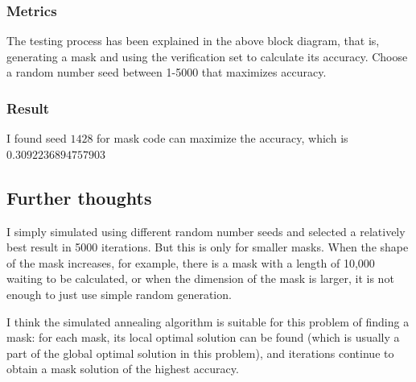 \documentclass{article}
\begin{document}
\subsubsection{Metrics}
The testing process has been explained in the above block diagram, that is, generating a mask and using the verification set to calculate its accuracy. Choose a random number seed between 1-5000 that maximizes accuracy.


\subsubsection{Result}
I found seed $1428$ for mask code can maximize the accuracy, which is $0.3092236894757903$


\subsection{Further thoughts}
I simply simulated using different random number seeds and selected a relatively best result in 5000 iterations. But this is only for smaller masks. When the shape of the mask increases, for example, there is a mask with a length of 10,000 waiting to be calculated, or when the dimension of the mask is larger, it is not enough to just use simple random generation.

I think the simulated annealing algorithm is suitable for this problem of finding a mask: for each mask, its local optimal solution can be found (which is usually a part of the global optimal solution in this problem), and iterations continue to obtain a mask solution of the highest accuracy.
\end{document}
